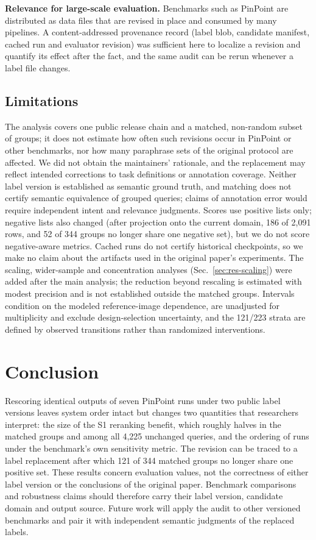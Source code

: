 \documentclass[conference]{IEEEtran}
\begin{document}
\textbf{Relevance for large-scale evaluation.} Benchmarks such as PinPoint are distributed as data files that are revised in place and consumed by many pipelines. A content-addressed provenance record (label blob, candidate manifest, cached run and evaluator revision) was sufficient here to localize a revision and quantify its effect after the fact, and the same audit can be rerun whenever a label file changes.

\subsection*{Limitations}
The analysis covers one public release chain and a matched, non-random subset of groups; it does not estimate how often such revisions occur in PinPoint or other benchmarks, nor how many paraphrase sets of the original protocol are affected. We did not obtain the maintainers' rationale, and the replacement may reflect intended corrections to task definitions or annotation coverage. Neither label version is established as semantic ground truth, and matching does not certify semantic equivalence of grouped queries; claims of annotation error would require independent intent and relevance judgments. Scores use positive lists only; negative lists also changed (after projection onto the current domain, 186 of 2,091 rows, and 52 of 344 groups no longer share one negative set), but we do not score negative-aware metrics. Cached runs do not certify historical checkpoints, so we make no claim about the artifacts used in the original paper's experiments. The scaling, wider-sample and concentration analyses (Sec.~\ref{sec:res-scaling}) were added after the main analysis; the reduction beyond rescaling is estimated with modest precision and is not established outside the matched groups. Intervals condition on the modeled reference-image dependence, are unadjusted for multiplicity and exclude design-selection uncertainty, and the 121/223 strata are defined by observed transitions rather than randomized interventions.

\section{Conclusion}
Rescoring identical outputs of seven PinPoint runs under two public label versions leaves system order intact but changes two quantities that researchers interpret: the size of the S1 reranking benefit, which roughly halves in the matched groups and among all 4,225 unchanged queries, and the ordering of runs under the benchmark's own sensitivity metric. The revision can be traced to a label replacement after which 121 of 344 matched groups no longer share one positive set. These results concern evaluation values, not the correctness of either label version or the conclusions of the original paper. Benchmark comparisons and robustness claims should therefore carry their label version, candidate domain and output source. Future work will apply the audit to other versioned benchmarks and pair it with independent semantic judgments of the replaced labels.
\end{document}
